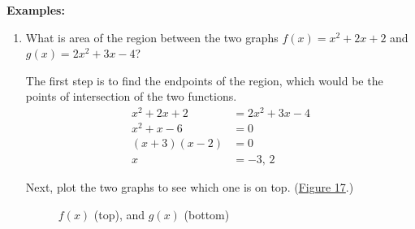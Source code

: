 \documentclass[12pt]{article}
\begin{document}
\noindent \textbf{Examples:}
\begin{enumerate}
    \item What is area of the region between the two graphs $f(x) = x^2 + 2x + 2$ and $g(x) = 2x^2 + 3x - 4$?

          The first step is to find the endpoints of the region, which would be the points of intersection of the two functions.
          \begin{align*}
              x^2 + 2x + 2 & = 2x^2 + 3x - 4 \\
              x^2 + x - 6  & = 0             \\
              (x+3)(x-2)   & = 0             \\
              x            & = -3, \, 2
          \end{align*}

          Next, plot the two graphs to see which one is on top. (\hyperref[fig:abcx1]{Figure 17}.)

          \begin{figure}[H]
              \begin{center}
                  \caption{$f(x)$ (top), and $g(x)$ (bottom)}
                  \label{fig:abcx1}
              \end{center}
          \end{figure}


\end{enumerate}
\end{document}
